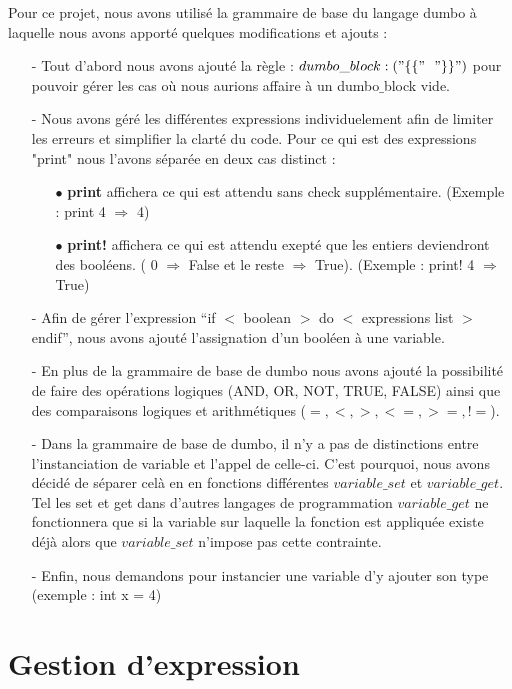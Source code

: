 \documentclass[a4paper, 12pt]{article}
\begin{document}
Pour ce projet, nous avons utilisé la grammaire de base du langage dumbo à laquelle nous avons apporté quelques modifications et ajouts : \begin{itemize}
	\item[-] Tout d'abord nous avons ajouté la règle : $dumbo\_block: ( "\{\{"\ \ "\}\}" )$ pour pouvoir gérer les cas où nous aurions affaire à un dumbo$\_$block vide.
	\item[-] Nous avons géré les différentes expressions individuelement afin de limiter les erreurs et simplifier la clarté du code. Pour ce qui est des expressions "print" nous l'avons séparée en deux cas distinct :\begin{itemize}
		\item[$\bullet$] \textbf{print} affichera ce qui est attendu sans check supplémentaire. (Exemple : print 4 $\Rightarrow$ 4)
		\item[$\bullet$] \textbf{print!} affichera ce qui est attendu exepté que les entiers deviendront des booléens. ( 0 $\Rightarrow$ False et le reste $\Rightarrow$ True). (Exemple : print! 4 $\Rightarrow$ True)	
	\end{itemize}
	\item[-] Afin de gérer l'expression “if $<$ boolean $>$ do $<$ expressions list $>$ endif”, nous avons ajouté l'assignation d'un booléen à une variable.
	\item[-] En plus de la grammaire de base de dumbo nous avons ajouté la possibilité de faire des opérations logiques (AND, OR, NOT, TRUE, FALSE) ainsi que des comparaisons logiques et arithmétiques ($ =, <, >, <=, >=, !=$).
	\item[-] Dans la grammaire de base de dumbo, il n'y a pas de distinctions entre l'instanciation de variable et l'appel de celle-ci. C'est pourquoi, nous avons décidé de séparer celà en en fonctions différentes $\textit{variable\_set}$ et $\textit{variable\_get}$. Tel les set et get dans d'autres langages de programmation $\textit{variable\_get}$ ne fonctionnera que si la variable sur laquelle la fonction est appliquée existe déjà alors que $\textit{variable\_set}$ n'impose pas cette contrainte.
	\item[-] Enfin, nous demandons pour instancier une variable d'y ajouter son type (exemple : int x = 4)
\end{itemize}

\section{Gestion d'expression}
\end{document}
